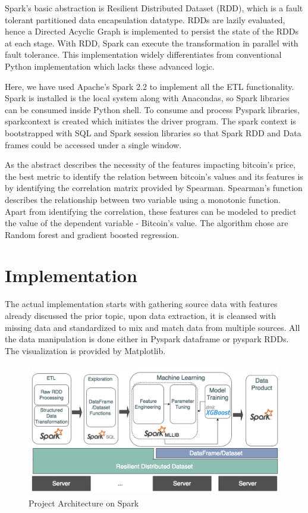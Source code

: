 \documentclass[sigconf]{acmart}
\begin{document}
Spark's basic abstraction is Resilient Distributed Dataset (RDD), which is a fault tolerant partitioned data encapsulation datatype. RDDs are lazily evaluated, hence a Directed Acyclic Graph is implemented to persist the state of the RDDs at each stage. With RDD, Spark can execute the transformation in parallel with fault tolerance. This implementation widely differentiates from conventional Python implementation which lacks these advanced logic.  

Here, we have used Apache's Spark 2.2 to implement all the ETL functionality. Spark is installed is the local system along with Anacondas, so Spark libraries can be consumed inside Python shell. To consume and process Pyspark libraries, sparkcontext is created which initiates the driver program. The spark context is bootstrapped with SQL and Spark session libraries so that Spark RDD and Data frames could be accessed under a single window.

As the abstract describes the necessity of the features impacting bitcoin's price, the best metric to identify the relation between bitcoin's values and its features is by identifying the correlation matrix provided by Spearman. Spearman's function describes the relationship between two variable using a monotonic function\cite{Spearman9:online}. Apart from identifying the correlation, these features can be modeled to predict the value of the dependent variable - Bitcoin's value. The algorithm chose are Random forest and gradient boosted regression.

\section{Implementation}
The actual implementation starts with gathering source data with features already discussed the prior topic, upon data extraction, it is cleansed with missing data and standardized to mix and match data from multiple sources. All the data manipulation is done either in Pyspark dataframe or pyspark RDDs. The visualization is provided by Matplotlib.

\begin{figure}[!ht]
  \centering\includegraphics[width=\columnwidth]{PROJECT/images/Projectflow.png}
  \caption{Project Architecture on Spark}
  \label{Architecture:spark}
\end{figure}
\end{document}
